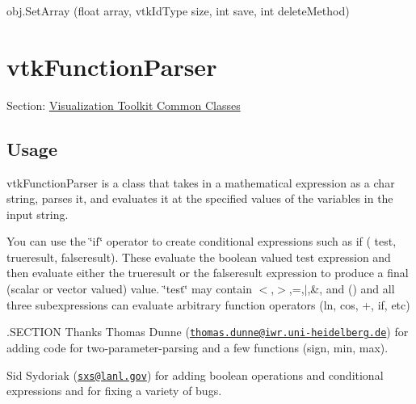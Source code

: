 \begin{DoxyItemize}
\item {\ttfamily obj.\-Set\-Array (float array, vtk\-Id\-Type size, int save, int delete\-Method)}  
\end{DoxyItemize}\hypertarget{vtkcommon_vtkfunctionparser}{}\section{vtk\-Function\-Parser}\label{vtkcommon_vtkfunctionparser}
Section\-: \hyperlink{sec_vtkcommon}{Visualization Toolkit Common Classes} \hypertarget{vtkwidgets_vtkxyplotwidget_Usage}{}\subsection{Usage}\label{vtkwidgets_vtkxyplotwidget_Usage}
vtk\-Function\-Parser is a class that takes in a mathematical expression as a char string, parses it, and evaluates it at the specified values of the variables in the input string.

You can use the \char`\"{}if\char`\"{} operator to create conditional expressions such as if ( test, trueresult, falseresult). These evaluate the boolean valued test expression and then evaluate either the trueresult or the falseresult expression to produce a final (scalar or vector valued) value. \char`\"{}test\char`\"{} may contain $<$,$>$,=,$|$,\&, and () and all three subexpressions can evaluate arbitrary function operators (ln, cos, +, if, etc)

.S\-E\-C\-T\-I\-O\-N Thanks Thomas Dunne (\href{mailto:thomas.dunne@iwr.uni-heidelberg.de}{\tt thomas.\-dunne@iwr.\-uni-\/heidelberg.\-de}) for adding code for two-\/parameter-\/parsing and a few functions (sign, min, max).

Sid Sydoriak (\href{mailto:sxs@lanl.gov}{\tt sxs@lanl.\-gov}) for adding boolean operations and conditional expressions and for fixing a variety of bugs.

